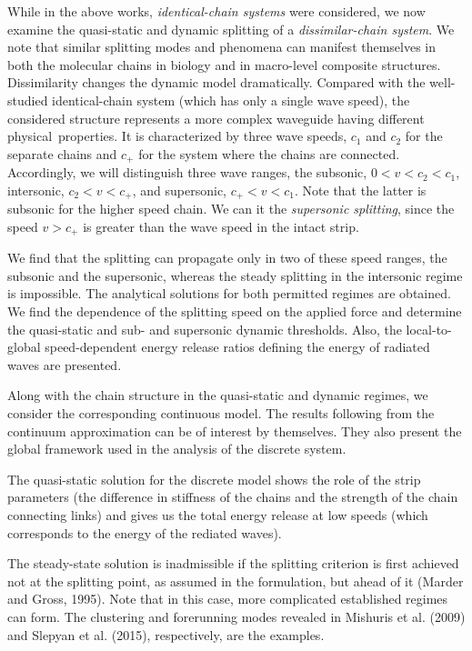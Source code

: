 \documentclass[12pt]{article}
\newcommand{\res}{respectively}
\begin{document}
While in the above works, {\em identical-chain systems} were considered, we now examine the quasi-static and dynamic splitting of a {\em dissimilar-chain system}. We note that similar splitting modes and phenomena can manifest themselves in both the molecular chains in biology and in macro-level composite structures. Dissimilarity changes the dynamic model dramatically. Compared with the well-studied identical-chain system (which has only a single wave speed), the considered structure represents a more complex waveguide having different physical properties. It is characterized by three wave speeds, $c_1$ and $c_2$ for the separate chains and $c_+$ for the system where the chains are connected. Accordingly, we will distinguish three wave ranges, the subsonic, $0<v<c_2<c_1$, intersonic, $c_2<v<c_+$, and supersonic, $c_+<v<c_1$. Note that the latter is subsonic for the higher speed chain. We can it the {\em supersonic splitting}, since the speed $v>c_+$ is greater than the wave speed in the intact strip.

We find that the splitting can propagate only in two of these speed ranges, the subsonic and the supersonic, whereas the steady splitting in the intersonic regime is impossible. The analytical solutions for both permitted regimes are obtained. We find the dependence of the splitting speed on the applied force and determine the quasi-static and sub- and supersonic dynamic thresholds. Also, the local-to-global speed-dependent energy release ratios defining the energy of radiated waves are presented.

Along with the chain structure in the quasi-static and dynamic regimes, we consider the corresponding continuous model. The results following from the continuum approximation can be of interest by themselves. They also present the global framework used in the analysis of the discrete system.

The quasi-static solution for the discrete model shows the role of the strip parameters (the difference in stiffness of the chains and the strength of the chain connecting links) and gives us the total energy release at low speeds (which corresponds to the energy of the rediated waves).

The steady-state solution is inadmissible if the splitting criterion is first achieved not at the splitting point, as assumed in the formulation, but ahead of it (Marder and Gross, 1995). Note that in this case, more complicated established regimes can form. The clustering and forerunning modes revealed in Mishuris et al. (2009) and  Slepyan et al. (2015), \res, are the examples.
\end{document}
